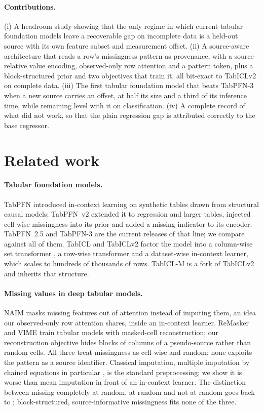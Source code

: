 \documentclass[11pt]{article}
\begin{document}
\paragraph{Contributions.}
(i) A headroom study showing that the only regime in which current tabular foundation
models leave a recoverable gap on incomplete data is a held-out source with its own
feature subset and measurement offset. (ii) A source-aware architecture that reads a
row's missingness pattern as provenance, with a source-relative value encoding,
observed-only row attention and a pattern token, plus a block-structured prior and two
objectives that train it, all bit-exact to TabICLv2 on complete data. (iii) The first
tabular foundation model that beats TabPFN-3 when a new source carries an offset, at
half its size and a third of its inference time, while remaining level with it on
classification. (iv) A complete record of what did not work, so that the plain
regression gap is attributed correctly to the base regressor.

\section{Related work}

\paragraph{Tabular foundation models.} TabPFN \citep{hollmann2023tabpfn} introduced
in-context learning on synthetic tables drawn from structural causal models; TabPFN~v2
\citep{hollmann2025tabpfnv2} extended it to regression and larger tables, injected
cell-wise missingness into its prior and added a missing indicator to its encoder.
TabPFN~2.5 and TabPFN-3 are the current releases of that line; we compare against all
of them. TabICL \citep{qu2025tabicl} and TabICLv2 \citep{qu2026tabiclv2} factor the
model into a column-wise set transformer \citep{lee2019set}, a row-wise transformer
and a dataset-wise in-context learner, which scales to hundreds of thousands of rows.
TabICL-M is a fork of TabICLv2 and inherits that structure.

\paragraph{Missing values in deep tabular models.} NAIM \citep{caruso2024naim} masks
missing features out of attention instead of imputing them, an idea our observed-only
row attention shares, inside an in-context learner. ReMasker \citep{du2024remasker}
and VIME \citep{yoon2020vime} train tabular models with masked-cell reconstruction; our
reconstruction objective hides blocks of columns of a pseudo-source rather than random
cells. All three treat missingness as cell-wise and random; none exploits the pattern as
a source identifier. Classical imputation, multiple imputation by chained equations in
particular \citep{vanbuuren2011mice}, is the standard preprocessing; we show it is
worse than mean imputation in front of an in-context learner. The distinction between
missing completely at random, at random and not at random goes back to
\citet{rubin1976inference}; block-structured, source-informative missingness fits none
of the three.
\end{document}
